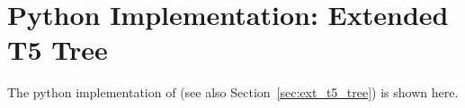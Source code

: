 \chapter{Python Implementation: Extended T5 Tree}
\label{cha:appendix_t5_tree_implementation}
The python implementation of \textit{\extree} (see also Section~\ref{sec:ext_t5_tree}) is shown here.



